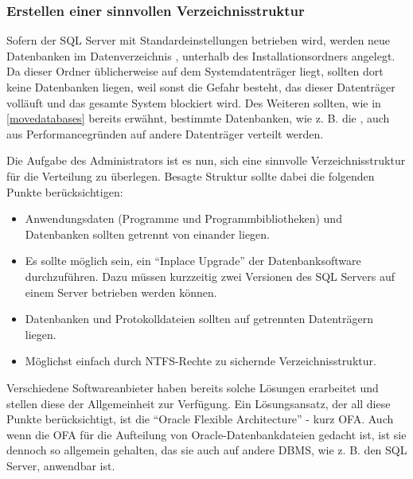         \subsubsection{Erstellen einer sinnvollen Verzeichnisstruktur}
          Sofern der SQL Server mit Standardeinstellungen betrieben wird, werden
          neue Datenbanken im Datenverzeichnis , unterhalb des
          Installationsordners angelegt. Da dieser Ordner üblicherweise auf dem
          Systemdatenträger  liegt, sollten dort
          keine Datenbanken liegen, weil sonst die Gefahr besteht, das dieser
          Datenträger volläuft und das gesamte System blockiert wird. Des
          Weiteren sollten, wie in \ref{movedatabases} bereits erwähnt,
          bestimmte Datenbanken, wie z. B. die , auch aus
          Performancegründen auf andere Datenträger verteilt werden.
          
          Die Aufgabe des Administrators ist es nun, sich eine sinnvolle
          Verzeichnisstruktur für die Verteilung zu überlegen. Besagte Struktur
          sollte dabei die folgenden Punkte berücksichtigen:
          \begin{itemize}
            \item Anwendungsdaten (Programme und Programmbibliotheken) und
            Datenbanken sollten getrennt von einander liegen.
            \item Es sollte möglich sein, ein \enquote{Inplace Upgrade} der
            Datenbanksoftware durchzuführen. Dazu müssen kurzzeitig zwei
            Versionen des SQL Servers auf einem Server betrieben werden können.
            \item Datenbanken und Protokolldateien sollten auf getrennten
            Datenträgern liegen.
            \item Möglichst einfach durch NTFS-Rechte zu sichernde
            Verzeichnisstruktur.
          \end{itemize}
          Verschiedene Softwareanbieter haben bereits solche Lösungen erarbeitet
          und stellen diese der Allgemeinheit zur Verfügung. Ein Lösungsansatz,
          der all diese Punkte berücksichtigt, ist die \enquote{Oracle Flexible
          Architecture} - kurz OFA. Auch wenn die OFA für die Aufteilung von
          Oracle-Datenbankdateien gedacht ist, ist sie dennoch so allgemein
          gehalten, das sie auch auf andere DBMS, wie z. B. den SQL Server,
          anwendbar ist.
          
